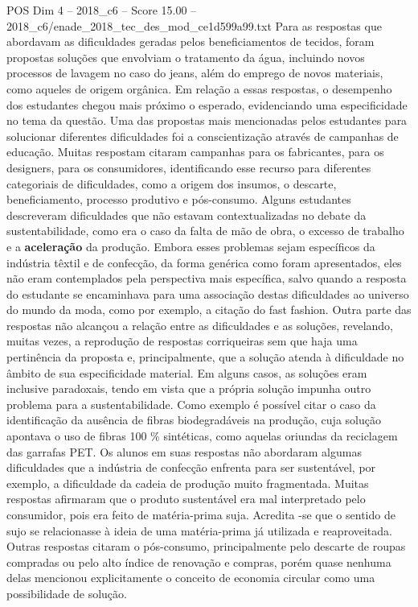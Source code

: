 \begin{textsample}{POS Dim 4 – 2018\_c6 – Score 15.00 – 2018\_c6/enade\_2018\_tec\_des\_mod\_ce1d599a99.txt}
Para as respostas que abordavam as dificuldades geradas pelos beneficiamentos de tecidos, foram propostas soluções que envolviam o tratamento da água, incluindo novos processos de lavagem no caso do jeans, além do emprego de novos materiais, como aqueles de origem orgânica.
Em relação a essas respostas, o desempenho dos estudantes chegou mais próximo o esperado, evidenciando uma especificidade no tema da questão.
Uma das propostas mais mencionadas pelos estudantes para solucionar diferentes dificuldades foi a conscientização através de campanhas de educação.
Muitas respostam citaram campanhas para os fabricantes, para os designers, para os consumidores, identificando esse recurso para diferentes categoriais de dificuldades, como a origem dos insumos, o descarte, beneficiamento, processo produtivo e pós-consumo.
Alguns estudantes descreveram dificuldades que não estavam contextualizadas no debate da sustentabilidade, como era o caso da falta de mão de obra, o excesso de trabalho e a \textbf{aceleração} da produção.
Embora esses problemas sejam específicos da indústria têxtil e de confecção, da forma genérica como foram apresentados, eles não eram contemplados pela perspectiva mais específica, salvo quando a resposta do estudante se encaminhava para uma associação destas dificuldades ao universo do mundo da moda, como por exemplo, a citação do fast fashion.
Outra parte das respostas não alcançou a relação entre as dificuldades e as soluções, revelando, muitas vezes, a reprodução de respostas corriqueiras sem que haja uma pertinência da proposta e, principalmente, que a solução atenda à dificuldade no âmbito de sua especificidade material.
Em alguns casos, as soluções eram inclusive paradoxais, tendo em vista que a própria solução impunha outro problema para a sustentabilidade.
Como exemplo é possível citar o caso da identificação da ausência de fibras biodegradáveis na produção, cuja solução apontava o uso de fibras 100 \% sintéticas, como aquelas oriundas da reciclagem das garrafas PET.
Os alunos em suas respostas não abordaram algumas dificuldades que a indústria de confecção enfrenta para ser sustentável, por exemplo, a dificuldade da cadeia de produção muito fragmentada.
Muitas respostas afirmaram que o produto sustentável era mal interpretado pelo consumidor, pois era feito de matéria-prima suja.
Acredita -se que o sentido de sujo se relacionasse à ideia de uma matéria-prima já utilizada e reaproveitada.
Outras respostas citaram o pós-consumo, principalmente pelo descarte de roupas compradas ou pelo alto índice de renovação e compras, porém quase nenhuma delas mencionou explicitamente o conceito de economia circular como uma possibilidade de solução.

\end{textsample}
